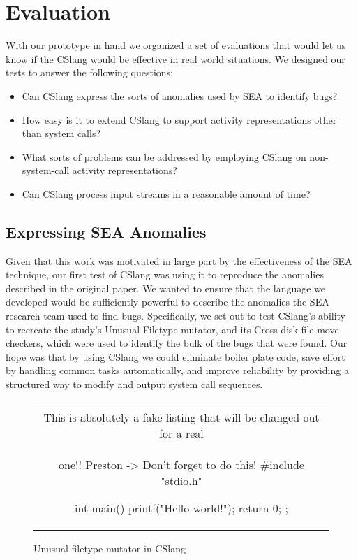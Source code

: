 \section{Evaluation}
\label{SEC:evaluation}

With our prototype in hand we organized a set of
evaluations that would let us know if the CSlang would be effective
in real world situations.
We designed our tests to answer the following questions:

\begin{itemize}

  \item{Can CSlang express the sorts of anomalies used by SEA to identify
    bugs?}

  \item{How easy is it to extend CSlang to support activity representations
    other than system calls?}

  \item{What sorts of problems can be addressed by employing CSlang on
  non-system-call activity representations?}

  \item{Can CSlang process input streams in a reasonable amount of time?}

\end{itemize}


\subsection{Expressing SEA Anomalies}
\label{sub:SEAAnomalies}
Given that this work was motivated
in large part
by the effectiveness of the SEA technique,
our first test of CSlang was using it to reproduce the anomalies described
in the original paper.
We wanted to ensure that
the language we developed
would be sufficiently powerful
to describe the anomalies the
SEA research team used to
find bugs.
Specifically,
we set out to test CSlang's ability to recreate
the study's Unusual Filetype mutator,
and its Cross-disk file move checkers, which were used to identify
the bulk of
the bugs that were found.
Our hope was that by using CSlang we could eliminate boiler plate code,
save effort by handling common tasks automatically, and improve reliability
by providing a structured way to modify and output system call sequences.

\begin{figure}[H]
\centering
\begin{tabular}{c}
\begin{lstlisting}
\\ This is absolutely a fake listing that will be changed out for a real
\\ one!!  Preston -> Don't forget to do this!
#include "stdio.h"

int main() {
    printf("Hello world!\n");
    return 0;
};
\end{lstlisting}
\end{tabular}
\caption{Unusual filetype mutator in CSlang}
\label{lst:UnusualFiletypeCSlang}
\end{figure}

